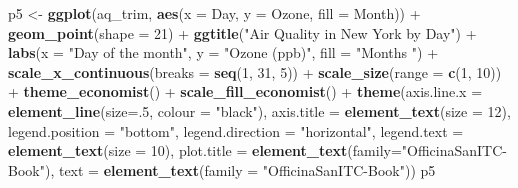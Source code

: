 \documentclass[]{article}
\newenvironment{Shaded}{\begin{snugshade}}{\end{snugshade}}
\newcommand{\KeywordTok}[1]{\textcolor[rgb]{0.13,0.29,0.53}{\textbf{{#1}}}}
\newcommand{\DataTypeTok}[1]{\textcolor[rgb]{0.13,0.29,0.53}{{#1}}}
\newcommand{\DecValTok}[1]{\textcolor[rgb]{0.00,0.00,0.81}{{#1}}}
\newcommand{\StringTok}[1]{\textcolor[rgb]{0.31,0.60,0.02}{{#1}}}
\newcommand{\NormalTok}[1]{{#1}}
\begin{document}
\begin{Shaded}
\begin{Highlighting}[]
\NormalTok{p5 <-}\StringTok{ }\KeywordTok{ggplot}\NormalTok{(aq_trim, }\KeywordTok{aes}\NormalTok{(}\DataTypeTok{x =} \NormalTok{Day, }\DataTypeTok{y =} \NormalTok{Ozone, }\DataTypeTok{fill =} \NormalTok{Month)) +}
\StringTok{  }\KeywordTok{geom_point}\NormalTok{(}\DataTypeTok{shape =} \DecValTok{21}\NormalTok{) +}
\StringTok{  }\KeywordTok{ggtitle}\NormalTok{(}\StringTok{"Air Quality in New York by Day"}\NormalTok{) +}\StringTok{ }
\StringTok{  }\KeywordTok{labs}\NormalTok{(}\DataTypeTok{x =} \StringTok{"Day of the month"}\NormalTok{, }\DataTypeTok{y =} \StringTok{"Ozone (ppb)"}\NormalTok{, }\DataTypeTok{fill =} \StringTok{"Months "}\NormalTok{) +}
\StringTok{  }\KeywordTok{scale_x_continuous}\NormalTok{(}\DataTypeTok{breaks =} \KeywordTok{seq}\NormalTok{(}\DecValTok{1}\NormalTok{, }\DecValTok{31}\NormalTok{, }\DecValTok{5}\NormalTok{)) +}
\StringTok{  }\KeywordTok{scale_size}\NormalTok{(}\DataTypeTok{range =} \KeywordTok{c}\NormalTok{(}\DecValTok{1}\NormalTok{, }\DecValTok{10}\NormalTok{)) +}
\StringTok{  }\KeywordTok{theme_economist}\NormalTok{() +}\StringTok{ }\KeywordTok{scale_fill_economist}\NormalTok{() +}
\StringTok{  }\KeywordTok{theme}\NormalTok{(}\DataTypeTok{axis.line.x =} \KeywordTok{element_line}\NormalTok{(}\DataTypeTok{size=}\NormalTok{.}\DecValTok{5}\NormalTok{, }\DataTypeTok{colour =} \StringTok{"black"}\NormalTok{),}
    \DataTypeTok{axis.title =} \KeywordTok{element_text}\NormalTok{(}\DataTypeTok{size =} \DecValTok{12}\NormalTok{),}
    \DataTypeTok{legend.position =} \StringTok{"bottom"}\NormalTok{, }\DataTypeTok{legend.direction =} \StringTok{"horizontal"}\NormalTok{,}
    \DataTypeTok{legend.text =} \KeywordTok{element_text}\NormalTok{(}\DataTypeTok{size =} \DecValTok{10}\NormalTok{),}
    \DataTypeTok{plot.title =} \KeywordTok{element_text}\NormalTok{(}\DataTypeTok{family=}\StringTok{"OfficinaSanITC-Book"}\NormalTok{),}
    \DataTypeTok{text =} \KeywordTok{element_text}\NormalTok{(}\DataTypeTok{family =} \StringTok{"OfficinaSanITC-Book"}\NormalTok{))}
\NormalTok{p5}
\end{Highlighting}
\end{Shaded}
\end{document}

